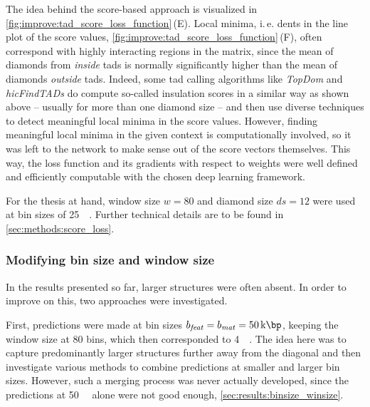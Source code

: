 The idea behind the score-based approach is visualized in \cref{fig:improve:tad_score_loss_function}\,(E).
Local minima, i.\,e. dents in the line plot of the score values, \cref{fig:improve:tad_score_loss_function}\,(F),
often correspond with highly interacting regions in the matrix, since the mean of diamonds from \emph{inside} \acrshort{tad}s
is normally significantly higher than the mean of diamonds \emph{outside} \acrshort{tad}s.
Indeed, some \acrshort{tad} calling algorithms like \emph{TopDom} \cite{Shin2015} and \emph{hicFindTADs} \cite[W12f.]{Wolff2018} 
do compute so-called insulation scores in a similar way as shown above -- usually for more than one diamond size -- 
and then use diverse techniques to detect meaningful local minima in the score values.
However, finding meaningful local minima in the given context is computationally involved,
so it was left to the network to make sense out of the score vectors themselves.
This way, the loss function and its gradients with respect to weights were well defined and efficiently computable with the chosen deep learning framework.

For the thesis at hand, window size $w=80$ and diamond size $ds=12$ were used at bin sizes of \SI{25}{\kilo\bp}.
Further technical details are to be found in \cref{sec:methods:score_loss}.

\subsubsection{Modifying bin size and window size}\label{sec:improve:binsize_winsize}
In the results presented so far, larger structures were often absent.
In order to improve on this, two approaches were investigated.

First, predictions were made at bin sizes $b_\mathit{feat} = b_\mathit{mat} = \SI{50}{\kilo\bp}$, 
keeping the window size at 80 bins, which then corresponded to \SI{4}{\mega\bp}.
The idea here was to capture predominantly larger structures further away from the diagonal and
then investigate various methods to combine predictions at smaller and larger bin sizes.
However, such a merging process was never actually developed,
since the predictions at \SI{50}{\kilo\bp} alone were not good enough, \cref{sec:results:binsize_winsize}.

